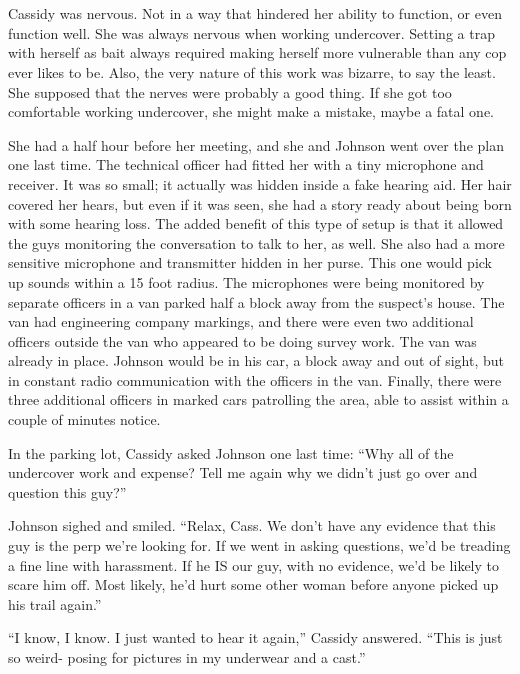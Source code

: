 \chapter{}
Cassidy was nervous. Not in a way that hindered her ability to function, or even function
well. She was always nervous when working undercover. Setting a trap with herself as bait always
required making herself more vulnerable than any cop ever likes to be. Also, the very nature of
this work was bizarre, to say the least. She supposed that the nerves were probably a good
thing. If she got too comfortable working undercover, she might make a mistake, maybe a fatal
one.

She had a half hour before her meeting, and she and Johnson went over the plan one last
time. The technical officer had fitted her with a tiny microphone and receiver. It was so small;
it actually was hidden inside a fake hearing aid. Her hair covered her hears, but even if it was
seen, she had a story ready about being born with some hearing loss. The added benefit of this
type of setup is that it allowed the guys monitoring the conversation to talk to her, as well.
She also had a more sensitive microphone and transmitter hidden in her purse. This one would
pick up sounds within a 15 foot radius. The microphones were being monitored by separate
officers in a van parked half a block away from the suspect's house. The van had engineering
company markings, and there were even two additional officers outside the van who appeared to be
doing survey work. The van was already in place. Johnson would be in his car, a block away and
out of sight, but in constant radio communication with the officers in the van. Finally, there
were three additional officers in marked cars patrolling the area, able to assist within a
couple of minutes notice.

In the parking lot, Cassidy asked Johnson one last time: ``Why all of the undercover work
and expense? Tell me again why we didn't just go over and question this guy?''

Johnson sighed and smiled. ``Relax, Cass. We don't have any evidence that this guy is the
perp we're looking for. If we went in asking questions, we'd be treading a fine line with
harassment. If he IS our guy, with no evidence, we'd be likely to scare him off. Most likely,
he'd hurt some other woman before anyone picked up his trail again.''

``I know, I know. I just wanted to hear it again,'' Cassidy answered. ``This is just so
weird- posing for pictures in my underwear and a cast.''

